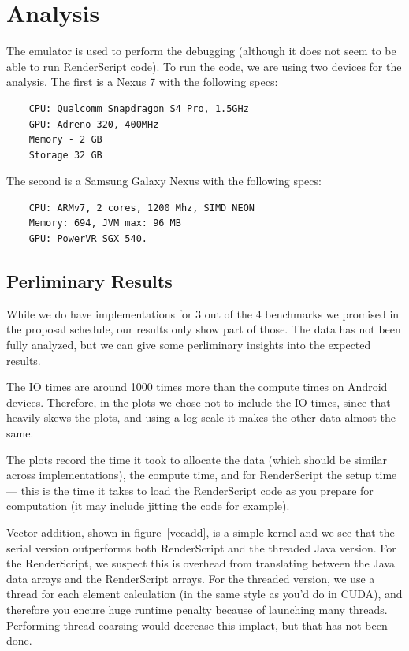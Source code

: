 \section*{Analysis}
\label{sec:analysis}

The emulator is used to perform the debugging (although it does not seem to be able to run RenderScript code).
To run the code, we are using two devices for the analysis.
The first is a Nexus 7 with the following specs:

\begin{verbatim}
    CPU: Qualcomm Snapdragon S4 Pro, 1.5GHz
    GPU: Adreno 320, 400MHz
    Memory - 2 GB
    Storage 32 GB
\end{verbatim}

The second is a Samsung Galaxy Nexus with the following specs:

\begin{verbatim}
    CPU: ARMv7, 2 cores, 1200 Mhz, SIMD NEON
    Memory: 694, JVM max: 96 MB
    GPU: PowerVR SGX 540.
\end{verbatim}


\subsection*{Perliminary Results}

While we do have implementations for 3 out of the 4 benchmarks we promised in the proposal schedule,
  our results only show part of those.
The data has not been fully analyzed, but we can give some perliminary insights into the expected
  results.

The IO times are around 1000 times more than the compute times on Android devices.
Therefore, in the plots we chose not to include the IO times, since that heavily skews
  the plots, and using a log scale it makes the other data almost the same.

The plots record the time it took to allocate the data (which should be similar across implementations),
  the compute time, and for RenderScript the setup time --- this is the time it takes to load the RenderScript code as you prepare for computation (it may include jitting the code for example).

Vector addition, shown in figure~\ref{vecadd}, is a simple kernel and we see that the serial version outperforms both RenderScript
  and the threaded Java version.
For the RenderScript, we suspect this is overhead from translating between the Java data arrays and
  the RenderScript arrays.
For the threaded version, we use a thread for each element calculation (in the same style as you'd do in CUDA), and therefore you encure huge runtime penalty because of launching many threads.
Performing thread coarsing would decrease this implact, but that has not been done. 

